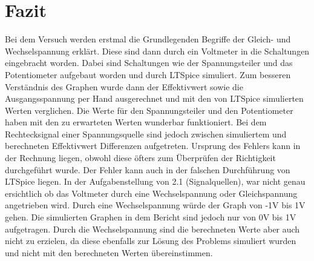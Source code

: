 \chapter{Fazit}
Bei dem Versuch werden erstmal die Grundlegenden Begriffe der Gleich- und Wechselspannung erklärt. 
Diese sind dann durch ein Voltmeter in die Schaltungen eingebracht worden. 
Dabei sind Schaltungen wie der Spannungsteiler und das Potentiometer aufgebaut worden 
und durch LTSpice simuliert. Zum besseren Verständnis des Graphen wurde 
dann der Effektivwert sowie die Ausgangsspannung per Hand ausgerechnet und mit den von 
LTSpice simulierten Werten verglichen. Die Werte für den Spannungsteiler und den Potentiometer
 haben mit den zu erwarteten Werten wunderbar funktioniert. Bei dem Rechtecksignal einer 
 Spannungsquelle sind jedoch zwischen simuliertem und berechneten Effektivwert Differenzen 
 aufgetreten. Ursprung des Fehlers kann in der Rechnung liegen, obwohl diese öfters zum Überprüfen 
 der Richtigkeit durchgeführt wurde. Der Fehler kann auch in der falschen Durchführung von 
 LTSpice liegen. In der Aufgabenstellung von 2.1 (Signalquellen), war nicht genau ersichtlich ob 
 das Voltmeter durch eine Wechselspannung oder Gleichspannung angetrieben wird. Durch eine 
 Wechselspannung würde der Graph von -1V bis 1V gehen. Die simulierten Graphen in dem Bericht 
 sind jedoch nur von 0V bis 1V aufgetragen. Durch die Wechselspannung sind die berechneten Werte 
 aber auch nicht zu erzielen, da diese ebenfalls zur Lösung des Problems simuliert wurden und 
 nicht mit den berechneten Werten übereinstimmen. 